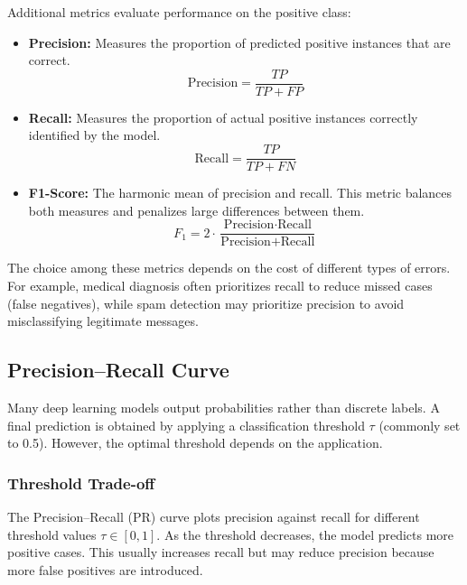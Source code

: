 Additional metrics evaluate performance on the positive class:

\begin{itemize}
    \item \textbf{Precision:} Measures the proportion of predicted positive instances that are correct.
    \begin{equation}
    \text{Precision} = \frac{TP}{TP + FP}
    \end{equation}
    
    \item \textbf{Recall:} Measures the proportion of actual positive instances correctly identified by the model.
    \begin{equation}
    \text{Recall} = \frac{TP}{TP + FN}
    \end{equation}
    
    \item \textbf{F1-Score:} The harmonic mean of precision and recall. This metric balances both measures and penalizes large differences between them.
    \begin{equation}
    F_1 = 2 \cdot \frac{\text{Precision} \cdot \text{Recall}}{\text{Precision} + \text{Recall}}
    \end{equation}
\end{itemize}

The choice among these metrics depends on the cost of different types of errors. For example, medical diagnosis often prioritizes recall to reduce missed cases (false negatives), while spam detection may prioritize precision to avoid misclassifying legitimate messages.

\subsection{Precision–Recall Curve}

Many deep learning models output probabilities rather than discrete labels. A final prediction is obtained by applying a classification threshold $\tau$ (commonly set to 0.5). However, the optimal threshold depends on the application.

\subsubsection{Threshold Trade-off}

The Precision–Recall (PR) curve plots precision against recall for different threshold values $\tau \in [0,1]$. As the threshold decreases, the model predicts more positive cases. This usually increases recall but may reduce precision because more false positives are introduced.

